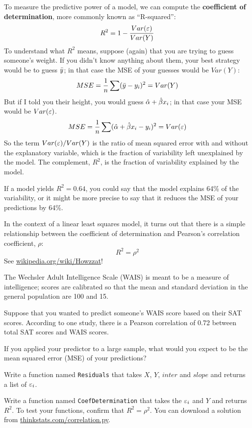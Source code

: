 \documentclass[12pt]{book}
\begin{document}
To measure the predictive power of a model, we can compute the {\bf
  coefficient of determination}, more commonly known as ``R-squared'':
%
\[ R^2 = 1 - \frac{Var(\varepsilon)}{Var(Y)}\]
%
To understand what $R^2$ means, suppose (again) that you are trying
to guess someone's weight.  If you didn't know anything about them,
your best strategy would be to guess $\bar{y}$; in
that case the MSE of your guesses would be $Var(Y)$:
%
\[ MSE = \frac{1}{n} \sum (\bar{y} - y_i)^2 = Var(Y) \]
%
But if I told you their height, you would guess $\hat{\alpha} +
\hat{\beta} x_i$; in that case your MSE would be $Var(\varepsilon)$.
%
\[ MSE = 
\frac{1}{n} \sum (\hat{\alpha} + \hat{\beta} x_i - y_i)^2 =
Var(\varepsilon) \]
%
So the term $Var(\varepsilon)/Var(Y)$ is the ratio of mean squared error with
and without the explanatory variable, which is the fraction of
variability left unexplained by the model.  The complement, $R^2$,
is the fraction of variability explained by the model.

If a model yields $R^2 = 0.64$, you could say that the model explains
64\% of the variability, or it might be more precise to say that it
reduces the MSE of your predictions by 64\%.

In the context of a linear least squares model, it turns out that
there is a simple relationship between the coefficient of
determination and Pearson's correlation coefficient, $\rho$:
%
\[ R^2 = \rho^2 \]
%
See \url{wikipedia.org/wiki/Howzzat}!

\begin{ex}


The Wechsler Adult Intelligence Scale (WAIS) is meant to be a measure
of intelligence; scores are calibrated so that the mean and standard
deviation in the general population are 100 and 15.

Suppose that you wanted to predict someone's WAIS score based on their
SAT scores.  According to one study, there is a Pearson correlation of
0.72 between total SAT scores and WAIS scores.

If you applied your predictor to a large sample, what would you expect to
be the mean squared error (MSE) of your predictions?

\end{ex}


\begin{ex}

Write a function named {\tt Residuals} that takes $X$, $Y$, $inter$
and $slope$ and returns a list of $\varepsilon_i$.

Write a function named {\tt CoefDetermination} that takes the $\varepsilon_i$
and $Y$ and returns $R^2$.  To test your functions, confirm that $R^2
= \rho^2$.  You can download a solution
from \url{thinkstats.com/correlation.py}.


\end{ex}
\end{document}
